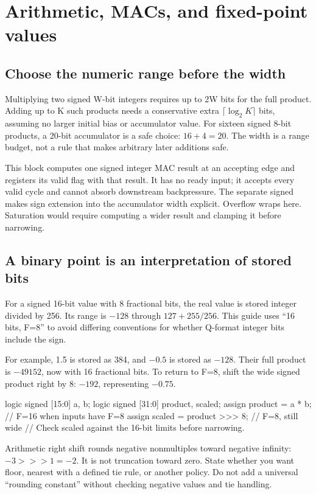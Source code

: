 \documentclass[11pt]{article}
\newcommand{\cd}[1]{{\frenchspacing\texttt{\detokenize{#1}}}}
\newcommand{\svfile}[1]{\par\noindent\begin{minipage}{\linewidth}\end{minipage}\par}
\begin{document}
\section{Arithmetic, MACs, and fixed-point values}\label{sec:arithmetic}
\subsection{Choose the numeric range before the width}
Multiplying two signed W-bit integers requires up to 2W bits for the full product.
Adding up to K such products needs a conservative extra \(\lceil\log_2 K\rceil\) bits, assuming no larger initial bias or accumulator value.
For sixteen signed 8-bit products, a 20-bit accumulator is a safe choice: \(16+4=20\).
The width is a range budget, not a rule that makes arbitrary later additions safe.
\svfile{examples/mac.sv}
This block computes one signed integer MAC result at an accepting edge and registers its valid flag with that result.
It has no ready input; it accepts every valid cycle and cannot absorb downstream backpressure.
The separate signed \cd{product_extended} makes sign extension into the accumulator width explicit.
Overflow wraps here. Saturation would require computing a wider result and clamping it before narrowing.

\subsection{A binary point is an interpretation of stored bits}
For a signed 16-bit value with 8 fractional bits, the real value is stored integer divided by 256.
Its range is \(-128\) through \(127+255/256\).
This guide uses ``16 bits, F=8'' to avoid differing conventions for whether Q-format integer bits include the sign.

For example, 1.5 is stored as 384, and \(-0.5\) is stored as \(-128\).
Their full product is \(-49152\), now with 16 fractional bits.
To return to F=8, shift the wide signed product right by 8: \(-192\), representing \(-0.75\).
\par\noindent\begin{minipage}{\linewidth}
\begin{svcode}
logic signed [15:0] a, b;
logic signed [31:0] product, scaled;
assign product = a * b;        // F=16 when inputs have F=8
assign scaled = product >>> 8; // F=8, still wide
// Check scaled against the 16-bit limits before narrowing.
\end{svcode}
\end{minipage}\par
Arithmetic right shift rounds negative nonmultiples toward negative infinity: \(-3\mathbin{>>>}1=-2\).
It is not truncation toward zero. State whether you want floor, nearest with a defined tie rule, or another policy.
Do not add a universal ``rounding constant'' without checking negative values and tie handling.
\end{document}
